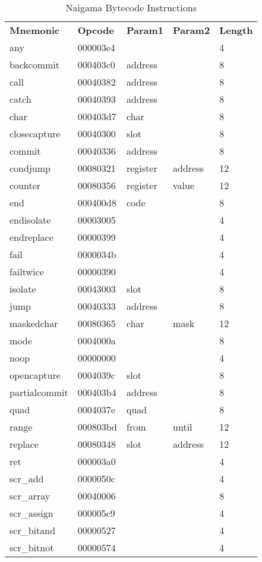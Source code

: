 
\begin{table}[]
\centering
\caption{Naigama Bytecode Instructions}
\label{tab:naig_bytecode}
\begin{tabular}{lllll}
\textbf{Mnemonic} & \textbf{Opcode} & \textbf{Param1} & \textbf{Param2} & \textbf{Length} \\
any & 000003e4 &  &   & 4 \\
backcommit & 000403c0 & address &   & 8 \\
call & 00040382 & address &   & 8 \\
catch & 00040393 & address &   & 8 \\
char & 000403d7 & char &   & 8 \\
closecapture & 00040300 & slot &   & 8 \\
commit & 00040336 & address &   & 8 \\
condjump & 00080321 & register & address  & 12 \\
counter & 00080356 & register & value  & 12 \\
end & 000400d8 & code &   & 8 \\
endisolate & 00003005 &  &   & 4 \\
endreplace & 00000399 &  &   & 4 \\
fail & 0000034b &  &   & 4 \\
failtwice & 00000390 &  &   & 4 \\
isolate & 00043003 & slot &   & 8 \\
jump & 00040333 & address &   & 8 \\
maskedchar & 00080365 & char & mask  & 12 \\
mode & 0004000a &  &   & 8 \\
noop & 00000000 &  &   & 4 \\
opencapture & 0004039c & slot &   & 8 \\
partialcommit & 000403b4 & address &   & 8 \\
quad & 0004037e & quad &   & 8 \\
range & 000803bd & from & until  & 12 \\
replace & 00080348 & slot & address  & 12 \\
ret & 000003a0 &  &   & 4 \\
scr_add & 0000050c &  &   & 4 \\
scr_array & 00040006 &  &   & 8 \\
scr_assign & 000005c9 &  &   & 4 \\
scr_bitand & 00000527 &  &   & 4 \\
scr_bitnot & 00000574 &  &   & 4 \\

\end{tabular}
\end{table}
